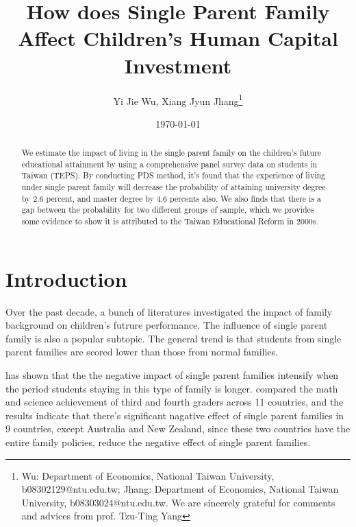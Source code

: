 \documentclass[]{AEA}
\begin{document}
\title{How does Single Parent Family Affect Children's Human Capital Investment}
\author{Yi Jie Wu, Xiang Jyun Jhang\thanks{Wu: Department of Economics, National Taiwan University, b08302129@ntu.edu.tw; Jhang: Department of Economics, National Taiwan University, b08303024@ntu.edu.tw.  We are sincerely grateful for comments and advices from prof. Tzu-Ting Yang}}
\date{\today}

\begin{abstract}
    We estimate the impact of living in the single parent family on the children's future educational attainment by using a comprehensive panel survey data on students in Taiwan (TEPS).  By conducting PDS method, it's found that the experience of living under single parent family will decrease the probability of attaining university degree by 2.6 percent, and master degree by 4.6 percents also.  We also finds that there is a gap between the probability for two different groups of sample, which we provides some evidence to show it is attributed to the Taiwan Educational Reform in 2000s.
\end{abstract}


\maketitle

\section{Introduction}

    Over the past decade, a bunch of literatures investigated the impact of family background on children's futrure performance. The influence of single parent family is also a popular subtopic. The general trend is that students from single parent families are scored lower than those from normal families.\citep{barajas2011} 

    \cite{krein1988} has shown that the the negative impact of single parent families intensify when the period students staying in this type of family is longer. \cite{pong2003} compared the math and science achievement of third and fourth graders across 11 countries, and the results indicate that there's significant nagative effect of single parent families in 9 countries, except Australia and New Zealand, since these two countries have the entire family policies, reduce the negative effect of single parent families.
\end{document}
